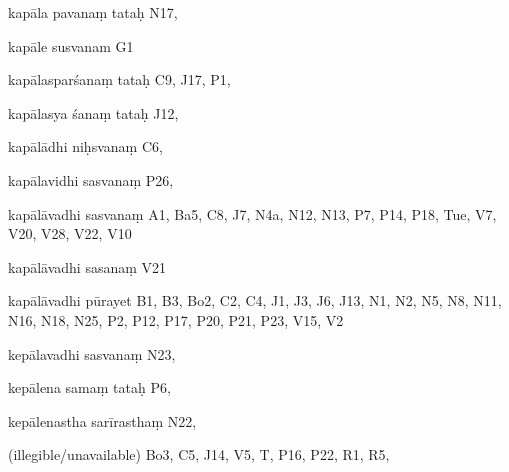 \begin{ekdosis}
\begin{marma}[hp01_055]
\begin{marma}[hp02_009]
\begin{marma}[hp02_011]
\begin{marma}[hp02_62b]
\item[kapāla pavanaṃ tataḥ] N17,
\item[kapāle susvanam] G1
\item[kapālasparśanaṃ tataḥ] C9, J17, P1,
\item[kapālasya śanaṃ tataḥ] J12,
\item[kapālādhi niḥsvanaṃ] C6,
\item[kapālavidhi sasvanaṃ] P26,
\item[kapālāvadhi sasvanaṃ] A1, Ba5, C8, J7, N4a, N12, N13, P7, P14, P18, Tue, V7, V20, V28, V22, V10
\item[kapālāvadhi sasanaṃ] V21
\item[kapālāvadhi pūrayet] B1, B3, Bo2, C2, C4, J1, J3, J6, J13, N1, N2, N5, N8, N11, N16, N18, N25, P2, P12, P17, P20, P21, P23, V15, V2
\item[kepālavadhi sasvanaṃ] N23, 
\item[kepālena samaṃ tataḥ] P6, 
\item[kepālenastha sarīrasthaṃ] N22,
 \item[(illegible/unavailable)] Bo3, C5, J14, V5, T, P16, P22, R1, R5,
  \begin{description}

    \end{description}
 \end{marma}


\end{marma}
\end{marma}
\end{marma}
\end{ekdosis}

